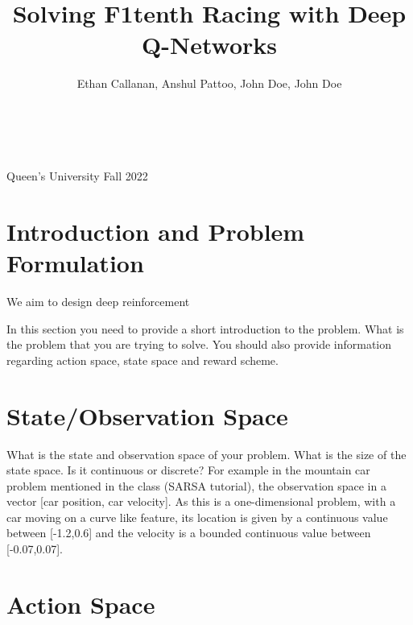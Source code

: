 \documentclass{article}
\title{\large Solving F1tenth Racing with Deep Q-Networks}
\author{\large Ethan Callanan, Anshul Pattoo, John Doe, John Doe}
\begin{document}


\makeatletter
    \begin{titlepage}
        \begin{center}
        \vbox{}\vspace{5cm}
            {\@title }\\[3cm] 
            {\@author}\\[0.5cm]
            {\large Queen's University}
            \null
            \vfill 
            {\large Fall 2022}
        \end{center}
    \end{titlepage}
\makeatother

\newpage
\section{Introduction and Problem Formulation}

We aim to design deep reinforcement  

In this section you need to provide a short introduction to the problem. What is the problem that you are trying to solve. You should also provide information regarding action space, state space and reward scheme.


\section{State/Observation Space}

What is the state and observation space of your problem. What is the size of the state space. Is it continuous or discrete? For example in the mountain car problem mentioned in the class (SARSA tutorial), the observation space in a vector [car position, car velocity]. As this is a one-dimensional problem, with a car moving on a curve like feature, its location is given by a continuous value between [-1.2,0.6] and the velocity is a bounded continuous value between [-0.07,0.07].

\section{Action Space}
\end{document}

